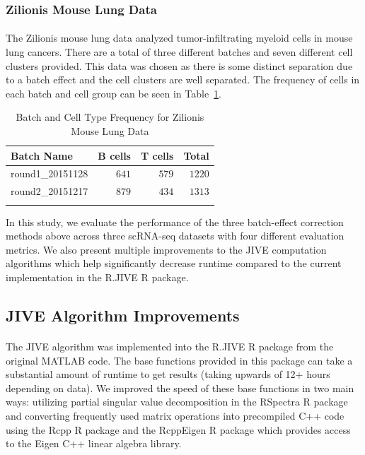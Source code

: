 \documentclass[unnumsec,webpdf,contemporary,large]{oup-authoring-template}%
\theoremstyle{thmstyleone}%
\theoremstyle{thmstyletwo}%
\theoremstyle{thmstylethree}%
\begin{document}
\subsubsection*{Zilionis Mouse Lung Data}

\paragraph*{}
The Zilionis mouse lung data \citep{zilionis2019single} analyzed tumor-infiltrating myeloid cells in mouse lung cancers. There are a total of three different batches and seven different cell clusters provided. This data was chosen as there is some distinct separation due to a batch effect and the cell clusters are well separated. The frequency of cells in each batch and cell group can be seen in Table~\ref{tab:freq_zilionis}.

\begin{table}[ht]
    \caption{Batch and Cell Type Frequency for Zilionis Mouse Lung Data}
    \centering
    \begin{tabular}{lrrr}
        \toprule
        Batch Name & B cells & T cells & Total \\
        \midrule
        round1\_20151128 & $641$ & $579$ & $1220$ \\
        round2\_20151217 & $879$ & $434$ & $1313$ \\
        \botrule
        \end{tabular}
    \label{tab:freq_zilionis}
\end{table}

In this study, we evaluate the performance of the three batch-effect correction methods above across three scRNA-seq datasets with four different evaluation metrics. We also present multiple improvements to the JIVE computation algorithms which help significantly decrease runtime compared to the current implementation in the R.JIVE R package.

\subsection{JIVE Algorithm Improvements} \label{jive_improvements}

\paragraph*{}
The JIVE algorithm was implemented into the R.JIVE R package \citep{o2016r} from the original MATLAB code. The base functions provided in this package can take a substantial amount of runtime to get results (taking upwards of 12+ hours depending on data). We improved the speed of these base functions in two main ways: utilizing partial singular value decomposition in the RSpectra R package \citep{qiu2019rspectra} and converting frequently used matrix operations into precompiled C++ code using the Rcpp R package \citep{edelbuettel2011rcpp} and the RcppEigen R package \citep{bates2013fast} which provides access to the Eigen C++ linear algebra library.
\end{document}
